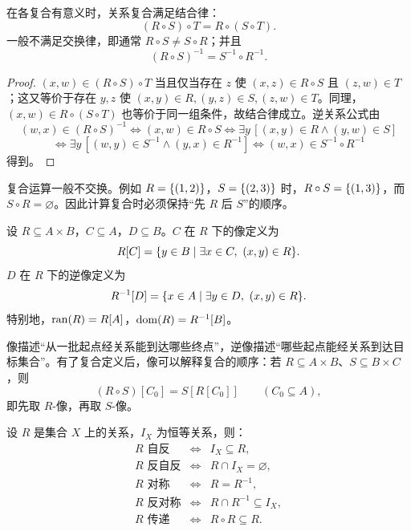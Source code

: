 \begin{theorem}[关系复合的性质]\label{ch2-composition-laws}
在各复合有意义时，关系复合满足结合律：
\[
  (R\circ S)\circ T=R\circ(S\circ T).
\]
一般不满足交换律，即通常 $R\circ S\ne S\circ R$；并且
\[
  (R\circ S)^{-1}=S^{-1}\circ R^{-1}.
\]
\end{theorem}

\begin{proof}
$(x,w)\in (R\circ S)\circ T$ 当且仅当存在 $z$ 使 $(x,z)\in R\circ S$ 且 $(z,w)\in T$；这又等价于存在 $y,z$ 使 $(x,y)\in R,(y,z)\in S,(z,w)\in T$。同理，$(x,w)\in R\circ(S\circ T)$ 也等价于同一组条件，故结合律成立。逆关系公式由
\[
(w,x)\in (R\circ S)^{-1}
\Longleftrightarrow (x,w)\in R\circ S
\Longleftrightarrow \exists y\,[(x,y)\in R\land(y,w)\in S]
\]
\[
\Longleftrightarrow \exists y\,[(w,y)\in S^{-1}\land(y,x)\in R^{-1}]
\Longleftrightarrow (w,x)\in S^{-1}\circ R^{-1}
\]
得到。
\end{proof}

复合运算一般不交换。例如 $R=\{(1,2)\}$，$S=\{(2,3)\}$ 时，$R\circ S=\{(1,3)\}$，而 $S\circ R=\varnothing$。因此计算复合时必须保持“先 $R$ 后 $S$”的顺序。

\begin{definition}[关系的像与逆像]\label{ch2-image-preimage}
设 $R\subseteq A\times B$，$C\subseteq A$，$D\subseteq B$。$C$ 在 $R$ 下的像定义为
\[
  R[C]=\{y\in B\mid \exists x\in C,\ (x,y)\in R\}.
\]
$D$ 在 $R$ 下的逆像定义为
\[
  R^{-1}[D]=\{x\in A\mid \exists y\in D,\ (x,y)\in R\}.
\]
特别地，$\operatorname{ran}(R)=R[A]$，$\operatorname{dom}(R)=R^{-1}[B]$。
\end{definition}

像描述“从一批起点经关系能到达哪些终点”，逆像描述“哪些起点能经关系到达目标集合”。有了复合定义后，像可以解释复合的顺序：若 $R\subseteq A\times B$、$S\subseteq B\times C$，则
\[
  (R\circ S)[C_0]=S[R[C_0]]\qquad(C_0\subseteq A),
\]
即先取 $R$-像，再取 $S$-像。

\begin{theorem}[关系性质的集合表达式刻画]\label{ch2-property-set-characterization}
设 $R$ 是集合 $X$ 上的关系，$I_X$ 为恒等关系，则：
\[
\begin{array}{rcl}
R\text{ 自反} &\Longleftrightarrow& I_X\subseteq R,\\
R\text{ 反自反} &\Longleftrightarrow& R\cap I_X=\varnothing,\\
R\text{ 对称} &\Longleftrightarrow& R=R^{-1},\\
R\text{ 反对称} &\Longleftrightarrow& R\cap R^{-1}\subseteq I_X,\\
R\text{ 传递} &\Longleftrightarrow& R\circ R\subseteq R.
\end{array}
\]
\end{theorem}

